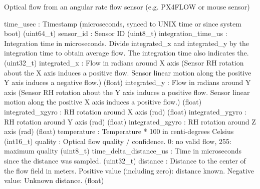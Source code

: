 \begin{DoxyVerb}
\begin{DoxyVerb}
\begin{DoxyVerb}
\begin{DoxyVerb}
\begin{DoxyVerb}Optical flow from an angular rate flow sensor (e.g. PX4FLOW or mouse
sensor)

time_usec                 : Timestamp (microseconds, synced to UNIX time or since system boot) (uint64_t)
sensor_id                 : Sensor ID (uint8_t)
integration_time_us        : Integration time in microseconds. Divide integrated_x and integrated_y by the integration time to obtain average flow. The integration time also indicates the. (uint32_t)
integrated_x              : Flow in radians around X axis (Sensor RH rotation about the X axis induces a positive flow. Sensor linear motion along the positive Y axis induces a negative flow.) (float)
integrated_y              : Flow in radians around Y axis (Sensor RH rotation about the Y axis induces a positive flow. Sensor linear motion along the positive X axis induces a positive flow.) (float)
integrated_xgyro          : RH rotation around X axis (rad) (float)
integrated_ygyro          : RH rotation around Y axis (rad) (float)
integrated_zgyro          : RH rotation around Z axis (rad) (float)
temperature               : Temperature * 100 in centi-degrees Celsius (int16_t)
quality                   : Optical flow quality / confidence. 0: no valid flow, 255: maximum quality (uint8_t)
time_delta_distance_us        : Time in microseconds since the distance was sampled. (uint32_t)
distance                  : Distance to the center of the flow field in meters. Positive value (including zero): distance known. Negative value: Unknown distance. (float)\end{DoxyVerb}
 \mbox{\label{classpymavlink_1_1dialects_1_1v10_1_1MAVLink_a1541ea4b3374e92f8dc8bf1c9460cd6e}} 

\end{DoxyVerb}
\end{DoxyVerb}
\end{DoxyVerb}
\end{DoxyVerb}
